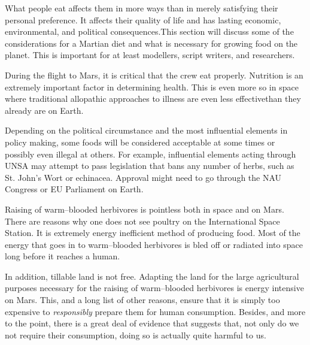 

What people eat affects them in more ways than in merely satisfying their personal preference. It affects their quality of life and has lasting economic, environmental, and political consequences. This section will discuss some of the considerations for a Martian diet and what is necessary for growing food on the planet. This is important for at least modellers, script writers, and researchers.

During the flight to Mars, it is critical that the crew eat properly. Nutrition is an extremely important factor in determining health. This is even more so in space where traditional allopathic approaches to illness are even less effective than they already are on Earth.

Depending on the political circumstance and the most influential elements in policy making, some foods will be considered acceptable at some times or possibly even illegal at others. For example, influential elements acting through UNSA may attempt to pass legislation that bans any number of herbs, such as St. John’s Wort or echinacea. Approval might need to go through the NAU Congress or EU Parliament on Earth.

Raising of warm--blooded herbivores is pointless both in space and on Mars. There are reasons why one does not see poultry on the International Space Station. It is extremely energy inefficient method of producing food. Most of the energy that goes in to warm--blooded herbivores is bled off or radiated into space long before it reaches a human. 

In addition, tillable land is not free. Adapting the land for the large agricultural purposes necessary for the raising of warm--blooded herbivores is energy intensive on Mars. This, and a long list of other reasons, ensure that it is simply too expensive to {\it responsibly} prepare them for human consumption. Besides, and more to the point, there is a great deal of evidence that suggests that, not only do we not require their consumption, doing so is actually quite harmful to us.

